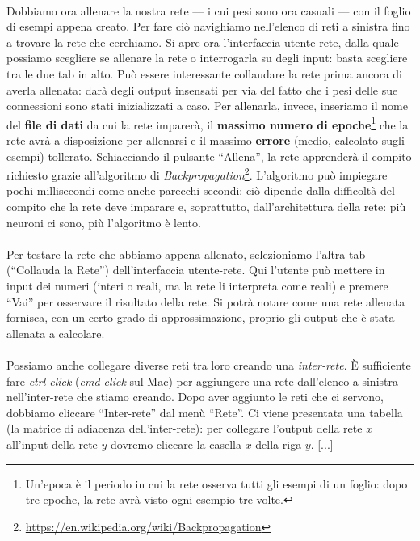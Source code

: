 \documentclass[12pt]{article}
\begin{document}
\paragraph{} Dobbiamo ora allenare la nostra rete --- i cui pesi sono ora casuali --- con il foglio di esempi appena creato. Per fare ciò navighiamo nell'elenco di reti a sinistra fino a trovare la rete che cerchiamo. Si apre ora l'interfaccia utente-rete, dalla quale possiamo scegliere se allenare la rete o interrogarla su degli input: basta scegliere tra le due tab in alto. Può essere interessante collaudare la rete prima ancora di averla allenata: darà degli output insensati per via del fatto che i pesi delle sue connessioni sono stati inizializzati a caso. Per allenarla, invece, inseriamo il nome del \textbf{file di dati} da cui la rete imparerà, il \textbf{massimo numero di epoche}\footnote{Un'epoca è il periodo in cui la rete osserva tutti gli esempi di un foglio: dopo tre epoche, la rete avrà visto ogni esempio tre volte.} che la rete avrà a disposizione per allenarsi e il massimo \textbf{errore} (medio, calcolato sugli esempi) tollerato. Schiacciando il pulsante “Allena”, la rete apprenderà il compito richiesto grazie all'algoritmo di \emph{Backpropagation}\footnote{\url{https://en.wikipedia.org/wiki/Backpropagation}}. L'algoritmo può impiegare pochi millisecondi come anche parecchi secondi: ciò dipende dalla difficoltà del compito che la rete deve imparare e, soprattutto, dall'architettura della rete: più neuroni ci sono, più l'algoritmo è lento.

\paragraph{} Per testare la rete che abbiamo appena allenato, selezioniamo l'altra tab (“Collauda la Rete”) dell'interfaccia utente-rete. Qui l'utente può mettere in input dei numeri (interi o reali, ma la rete li interpreta come reali) e premere “Vai” per osservare il risultato della rete. Si potrà notare come una rete allenata fornisca, con un certo grado di approssimazione, proprio gli output che è stata allenata a calcolare.

\paragraph{} Possiamo anche collegare diverse reti tra loro creando una \emph{inter-rete}. È sufficiente fare \emph{ctrl-click} (\emph{cmd-click} sul Mac) per aggiungere una rete dall'elenco a sinistra nell'inter-rete che stiamo creando. Dopo aver aggiunto le reti che ci servono, dobbiamo cliccare “Inter-rete” dal menù “Rete”. Ci viene presentata una tabella (la matrice di adiacenza dell'inter-rete): per collegare l'output della rete $x$ all'input della rete $y$ dovremo cliccare la casella $x$ della riga $y$. [...]
\end{document}

